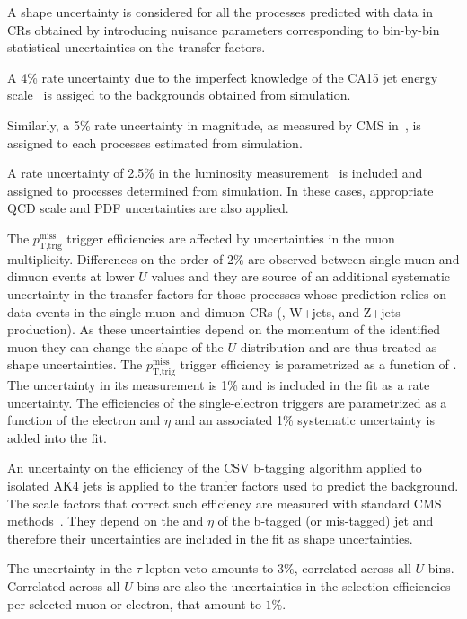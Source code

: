 A shape uncertainty is considered for all the processes predicted with data in CRs obtained by introducing nuisance parameters corresponding to bin-by-bin statistical uncertainties on the transfer factors.

A 4\% rate uncertainty due to the imperfect knowledge of the CA15 jet energy scale~\cite{jec} is assiged to the backgrounds obtained from simulation.

Similarly, a 5\% rate uncertainty in \ptmiss magnitude, as measured by CMS in~\cite{Khachatryan:2014gga}, is assigned to each processes estimated from simulation.

A rate uncertainty of 2.5\% in the luminosity measurement~\cite{CMS-PAS-LUM-17-001} is included and assigned to processes determined from simulation. In these cases, appropriate QCD scale and PDF uncertainties are also applied.

The $p_\text{T,trig}^\text{miss}$ trigger efficiencies are affected by uncertainties in the muon multiplicity.  Differences on the order of 2\% are observed between single-muon and dimuon events at lower $U$ values and they are source of an additional systematic uncertainty in the transfer factors for those processes whose prediction relies on data events in the single-muon and
dimuon CRs (\ttbar, W+jets, and Z+jets production). As these uncertainties depend on the momentum of the identified muon they can change the shape of the $U$ distribution and are thus treated as shape uncertainties. The $p_\text{T,trig}^\text{miss}$ trigger efficiency is parametrized as a function of \ptmiss. The uncertainty in its measurement is 1\% and is included in the fit as a rate uncertainty.
The efficiencies of the single-electron triggers are parametrized as a function of the electron \pt and $\eta$ and an associated 1\% systematic uncertainty is added into the fit.

An uncertainty on the efficiency of the CSV b-tagging algorithm applied to isolated AK4 jets is applied to the tranfer factors used to predict the \ttbar background. The scale factors that correct such efficiency are measured with standard CMS methods~\cite{Sirunyan:2017ezt}. They depend on the \pt and $\eta$ of the b-tagged (or mis-tagged) jet and therefore their uncertainties are included in the fit as shape uncertainties.

The uncertainty in the $\tau$ lepton veto amounts to $3\%$, correlated across all $U$ bins. Correlated across all $U$ bins are also the uncertainties in the selection efficiencies per selected muon or electron, that amount to $1\%$.

